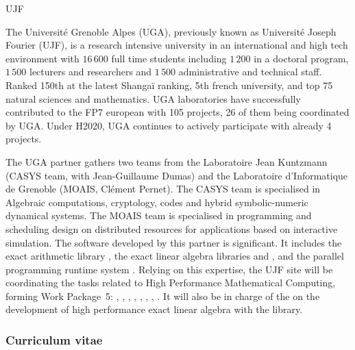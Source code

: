 \begin{sitedescription}{UJF}



The Université Grenoble Alpes (UGA), previously known as Université Joseph Fourier
(UJF), is a research intensive university in an
international and high tech environment with $16\,600$ full time students
including $1\,200$ in a doctoral program, $1\,500$ lecturers and researchers and
$1\,500$ administrative and technical staff. Ranked 150th at the latest Shanga\"i
ranking, 5th french university, and top 75 natural sciences and mathematics.
UGA laboratories have successfully contributed to the FP7 european with 
105 projects, 26 of them being coordinated by UGA. Under H2020, UGA continues to
actively participate with already 4 projects.

The UGA partner gathers two teams from the Laboratoire Jean Kuntzmann
(CASYS team, with Jean-Guillaume Dumas) and the Laboratoire d’Informatique de
Grenoble (MOAIS, Clément Pernet). The 
CASYS team is specialised in Algebraic computations, cryptology, codes and hybrid symbolic-numeric dynamical systems. The MOAIS team is specialised in programming and scheduling
design on distributed resources for applications based on interactive simulation. The software
developed by this partner is significant. It includes the exact arithmetic
library \Givaro, the exact linear algebra libraries \fflas and \Linbox, and the
parallel programming runtime system .
Relying on this expertise, the UJF site will be coordinating the tasks related
to High Performance Mathematical Computing, forming Work Package~5:
, 
, 
, 
,
, 
,
,
.
It will also be in charge of the  on the
development of high performance exact linear algebra with the \Linbox library.
\subsubsection*{Curriculum vitae}





%


\end{sitedescription}
